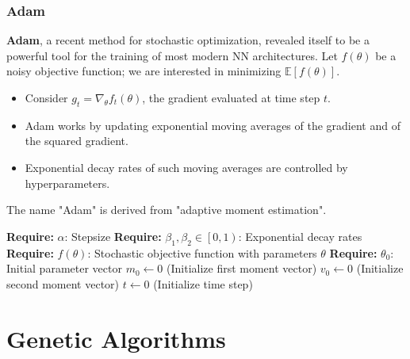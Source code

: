 \documentclass{beamer}
\begin{document}
\begin{frame}
\frametitle{Adam}
\textbf{Adam}, a recent method for stochastic optimization, revealed itself to be a powerful tool for the training of most modern NN architectures. Let $f(\theta)$ be a noisy objective function; we are interested in minimizing $\mathbb{E}\left[f(\theta)\right]$.
\begin{itemize}
\item Consider $g_t = \nabla_{\theta}f_t(\theta)$, the gradient evaluated at time step $t$.
\item Adam works by updating exponential moving averages of the gradient and of the squared gradient.
\item Exponential decay rates of such moving averages are controlled by hyperparameters.
\end{itemize}
The name "Adam" is derived from "adaptive moment estimation".
\end{frame}

\begin{frame}
\begin{algorithm}[H]
 \textbf{Require:} $\alpha$: Stepsize\;
 \textbf{Require:} $\beta_1,\beta_2 \in \left[0,1\right)$: Exponential decay rates\;
 \textbf{Require:} $f(\theta)$: Stochastic objective function with parameters $\theta$\;
 \textbf{Require:} $\theta_0$: Initial parameter vector\;
 $m_0 \leftarrow 0$ (Initialize first moment vector)\;
 $v_0 \leftarrow 0$ (Initialize second moment vector)\;
 $t \leftarrow 0$ (Initialize time step)\;
\end{algorithm}
\end{frame}


\section{Genetic Algorithms}
\end{document}
